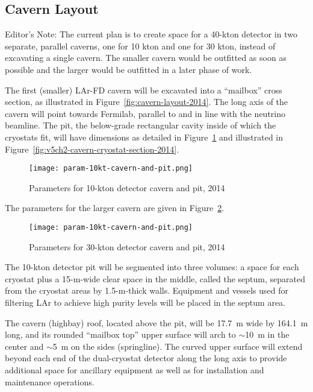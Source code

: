 \subsection{Cavern Layout}

\begin{editornote}
  Editor's Note: The current plan is to create space for a 40-kton detector in two separate, parallel caverns, one for 10 kton and one for 30 kton, instead of excavating a single cavern. The smaller cavern would be outfitted as soon as possible and the larger would be outfitted in a later phase of work. 
\end{editornote}


The first (smaller) LAr-FD cavern will be excavated into a ``mailbox'' cross section, as illustrated in 
Figure~\ref{fig:cavern-layout-2014}. The long axis of the cavern will point towards Fermilab, parallel to and in 
line with the neutrino beamline. The pit, the below-grade rectangular cavity inside of which the cryostats 
fit, will have dimensions %
as detailed in Figure~\ref{fig:cavern-pit-params-10kt} and illustrated in Figure~\ref{fig:v5ch2-cavern-cryostat-section-2014}.

\begin{figure}[htbp]
\centering
\texttt{[image: param-10kt-cavern-and-pit.png]}
\caption{Parameters for 10-kton detector cavern and pit, 2014}
\label{fig:cavern-pit-params-10kt}
\end{figure}

The parameters for the larger cavern are given in Figure~\ref{fig:cavern-pit-params-30kt}.
\begin{figure}[htbp]
\centering
\texttt{[image: param-10kt-cavern-and-pit.png]}
\caption{Parameters for 30-kton detector cavern and pit, 2014}
\label{fig:cavern-pit-params-30kt}
\end{figure}

The 10-kton detector pit will be segmented into three 
volumes: a space for each cryostat plus a 15-m-wide clear space in the middle, called the septum,  separated from the cryostat areas by 1.5-m-thick  
walls. Equipment and vessels used for filtering LAr to achieve high purity levels will be placed in 
the septum area.  

The cavern (highbay) roof, located above the pit, will be 17.7~m wide by 164.1~m long, and its 
rounded ``mailbox top'' upper surface will arch to $\sim$10~m in the center and $\sim$5~m on the 
sides (springline). The curved upper surface will extend beyond each end of the dual-cryostat detector along the long 
axis to provide additional space for ancillary equipment as well as for installation and maintenance 
operations. 

